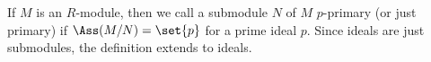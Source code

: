 If $M$ is an $R$-module, then we call a submodule $N$ of $M$ $p$-primary
(or just primary) if $\Ass(M/N) = \set{p}$ for a prime ideal $p$. Since ideals
are just submodules, the definition extends to ideals.
